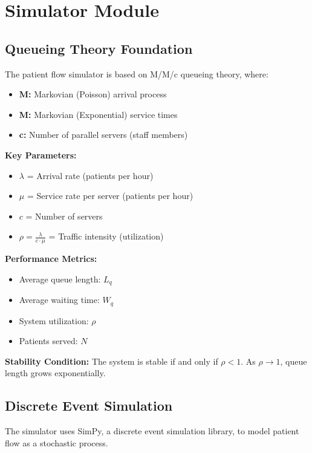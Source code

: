 \documentclass[12pt,a4paper]{article}
\begin{document}
\section{Simulator Module}
\label{sec:simulator}

\subsection{Queueing Theory Foundation}
\label{subsec:queueing}

The patient flow simulator is based on M/M/c queueing theory, where:
\begin{itemize}
    \item \textbf{M:} Markovian (Poisson) arrival process
    \item \textbf{M:} Markovian (Exponential) service times
    \item \textbf{c:} Number of parallel servers (staff members)
\end{itemize}

\textbf{Key Parameters:}
\begin{itemize}
    \item $\lambda$ = Arrival rate (patients per hour)
    \item $\mu$ = Service rate per server (patients per hour)
    \item $c$ = Number of servers
    \item $\rho = \frac{\lambda}{c \cdot \mu}$ = Traffic intensity (utilization)
\end{itemize}

\textbf{Performance Metrics:}
\begin{itemize}
    \item Average queue length: $L_q$
    \item Average waiting time: $W_q$
    \item System utilization: $\rho$
    \item Patients served: $N$
\end{itemize}

\textbf{Stability Condition:} The system is stable if and only if $\rho < 1$. As $\rho \to 1$, queue length grows exponentially.

\subsection{Discrete Event Simulation}

The simulator uses SimPy, a discrete event simulation library, to model patient flow as a stochastic process.
\end{document}
